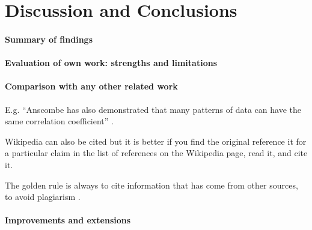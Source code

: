 \section{Discussion and Conclusions}

    \paragraph{Summary of findings}

    \paragraph{Evaluation of own work: strengths and limitations}

    \paragraph{Comparison with any other related work}
        E.g. ``Anscombe has also demonstrated that many patterns of data can have the
            same correlation coefficient'' \cite{anscombe1973graphs}.

        Wikipedia can also be cited but it is better if you find the original reference
            it for a particular claim in the list of references on the Wikipedia page, read
            it, and cite it.

        The golden rule is always to cite information that has come from other sources,
            to avoid plagiarism \cite{wiki:plagarism}.

    \paragraph{Improvements and extensions}